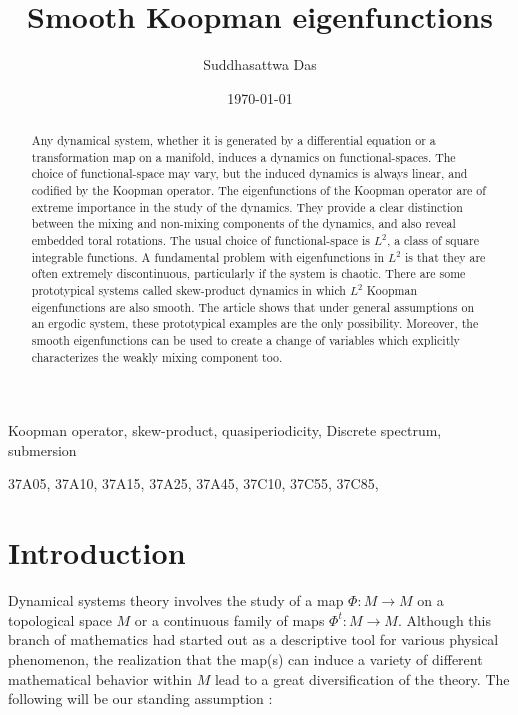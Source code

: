 \documentclass[12pt,oneside]{article}
\begin{document}
\title{\vspace{-1cm} Smooth Koopman eigenfunctions}
\author{Suddhasattwa Das\footnotemark[1]}
\date{\today}
\maketitle
\begin{abstract} 
	Any dynamical system, whether it is generated by a differential equation or a transformation map on a manifold, induces a dynamics on functional-spaces. The choice of functional-space may vary, but the induced dynamics is always linear, and codified by the Koopman operator. The eigenfunctions of the Koopman operator are of extreme importance in the study of the dynamics. They provide a clear distinction between the mixing and non-mixing components of the dynamics, and also reveal embedded toral rotations. The usual choice of functional-space is $L^2$, a class of square integrable functions. A fundamental problem with eigenfunctions in $L^2$ is that they are often extremely discontinuous, particularly if the system is chaotic. There are some prototypical systems called skew-product dynamics in which $L^2$ Koopman eigenfunctions are also smooth. The article shows that under general assumptions on an ergodic system, these prototypical examples are the only possibility. Moreover, the smooth eigenfunctions can be used to create a change of variables which explicitly characterizes the weakly mixing component too.
\end{abstract}

\begin{keywords}
Koopman operator, skew-product, quasiperiodicity, Discrete spectrum, submersion
\end{keywords}
\begin{AMS}	37A05, 37A10, 37A15, 37A25, 37A45, 37C10, 37C55, 37C85, \end{AMS}

\section{Introduction} \label{sec:intro}

Dynamical systems theory involves the study of a map $\Phi : M\to M$ on a topological space $M$ or a continuous family of maps $\Phi^t:M\to M$. Although this branch of mathematics had started out as a descriptive tool for various physical phenomenon, the realization that the map(s) can induce a variety of different mathematical behavior within $M$ lead to a great diversification of the theory. The following will be our standing assumption : 
\end{document}
